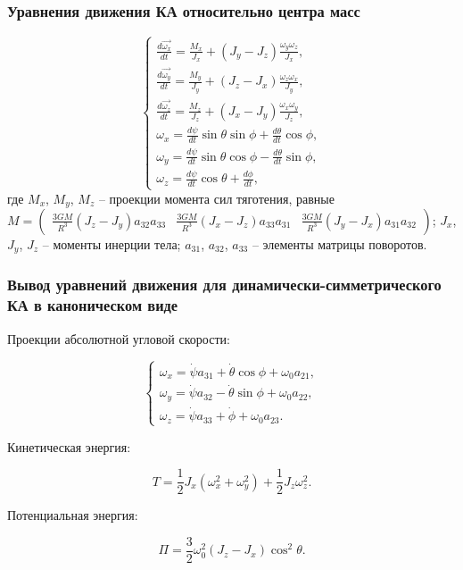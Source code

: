 \documentclass[10pt,pdf,hyperref={unicode}]{beamer}
\begin{document}
\begin{frame}
\frametitle{Уравнения движения КА относительно центра масс}
	\begin{equation*}
		\begin{cases}
			\frac{d\vec{\omega_x}}{dt} = \frac{M_x}{J_x} + \left(J_y - J_z\right) \frac{\omega_y \omega_z}{J_x},\\
			\frac{d\vec{\omega_y}}{dt} = \frac{M_y}{J_y} + \left(J_z - J_x\right) \frac{\omega_z \omega_x}{J_y},\\
			\frac{d\vec{\omega_z}}{dt} = \frac{M_z}{J_z} + \left(J_x - J_y\right) \frac{\omega_x \omega_y}{J_z},\\
			\omega_x = \frac{d\psi}{dt} \sin \theta \sin \phi + \frac{d\theta}{dt} \cos \phi, \\
			\omega_y = \frac{d\psi}{dt} \sin \theta \cos \phi - \frac{d\theta}{dt} \sin \phi, \\
			\omega_z = \frac{d\psi}{dt} \cos \theta + \frac{d\phi}{dt},
		\end{cases}
	\end{equation*}
	где $M_x$, $M_y$, $M_z$ – проекции момента сил тяготения, равные $M=\begin{pmatrix}\frac{3 GM}{R^3} (J_z - J_y) a_{32} a_{33} & \frac{3 GM}{R^3} (J_x - J_z) a_{33} a_{31} & \frac{3 GM}{R^3} (J_y - J_x) a_{31} a_{32}\end{pmatrix}$; $J_x$, $J_y$, $J_z$ – моменты инерции тела; $a_{31}$, $a_{32}$, $a_{33}$ – элементы матрицы поворотов.
\end{frame}
\begin{frame}
\frametitle{Вывод уравнений движения для динамически-симметрического КА в каноническом виде}
	Проекции абсолютной угловой скорости:
	
	\begin{equation}
	\label{eq:angle_v}
		\begin{cases}
			\omega_x = \dot{\psi} a_{31} + \dot{\theta} \cos \phi + \omega_0 a_{21}, \\
			\omega_y = \dot{\psi} a_{32} - \dot{\theta} \sin \phi + \omega_0 a_{22}, \\
			\omega_z = \dot{\psi} a_{33} + \dot{\phi} + \omega_0 a_{23}.
		\end{cases}
	\end{equation}
	
	Кинетическая энергия:
	
	\begin{equation}
	\label{eq:kinetic}
		T = \frac{1}{2} J_x (\omega_x^2 + \omega_y^2) + \frac{1}{2} J_z \omega_z^2.
	\end{equation}
	
	Потенциальная энергия:
	
	\begin{equation*}
		\Pi = \frac{3}{2} \omega_0^2 \left(J_z - J_x \right) \cos^2 \theta.
	\end{equation*}
\end{frame}
\end{document}
